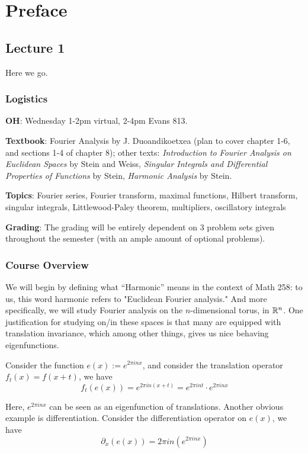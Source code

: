 \chapter{Preface}
\section{Lecture 1}
Here we go.
\subsection{Logistics}
\textbf{OH}: Wednesday 1-2pm virtual, 2-4pm Evans 813.

\textbf{Textbook}: Fourier Analysis by J. Duoandikoetxea (plan to cover chapter 1-6, and sections 1-4 of chapter 8); other texts: \textit{Introduction to Fourier Analysis on Euclidean Spaces} by Stein and Weiss, \textit{Singular Integrals and Differential Properties of Functions} by Stein, \textit{Harmonic Analysis} by Stein.

\textbf{Topics}: Fourier series, Fourier transform, maximal functions, Hilbert transform, singular integrals, Littlewood-Paley theorem, multipliers, oscillatory integrals

\textbf{Grading}: The grading will be entirely dependent on 3 problem sets given throughout the semester (with an ample amount of optional problems).


\subsection{Course Overview}
We will begin by defining what ``Harmonic'' means in the context of Math 258: to us, this word harmonic refers to "Euclidean Fourier analysis." And more specifically, we will study Fourier analysis on the $n$-dimensional torus, in $\mathbb{R}^n$. One justification for studying on/in these spaces is that many are equipped with translation invariance, which among other things, gives us nice behaving eigenfunctions.

Consider the function $e(x):=e^{2\pi inx}$, and consider the translation operator $f_t(x)=f(x+t)$, we have
\begin{equation*}
    f_t(e(x))=e^{2\pi in(x+t)}=e^{2\pi int}\cdot e^{2\pi inx}
\end{equation*}

Here, $e^{2\pi inx}$ can be seen as an eigenfunction of translations. Another obvious example is differentiation. Consider the differentiation operator on $e(x)$, we have
\begin{equation*}
    \partial_x(e(x))=2\pi in(e^{2\pi inx})
\end{equation*}

